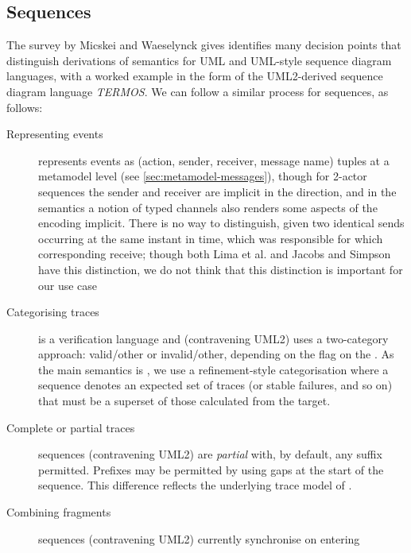

\subsection{Sequences}

The survey by Micskei and Waeselynck gives identifies many decision points that
distinguish derivations of semantics for UML and UML-style sequence diagram
languages, with a worked example in the form of the
UML2-derived sequence diagram language \emph{TERMOS}.
We can follow a similar process for \langname{} sequences, as follows:

\begin{description}
\item[Representing events]
  \langname{} represents events as (action, sender, receiver, message name)
  tuples at a metamodel level (see \cref{sec:metamodel-messages}),
  though for 2-actor sequences the sender and
  receiver are implicit in the direction, and in the \tockcsp{} semantics a
  notion of typed channels also renders some aspects of the encoding implicit.
  There is no way to distinguish, given two identical sends occurring at the
  same instant in time, which was responsible for which corresponding receive;
  though both Lima et al. and Jacobs and Simpson have this distinction,
  we do not think that this distinction is important for our use case
\item[Categorising traces]
  \langname{} is a verification language and (contravening UML2)
  uses a two-category approach: valid/other or invalid/other, depending on the
   flag on the \massertion.
  As the main \langname{} semantics is \tockcsp, we use a
  refinement-style categorisation where a sequence denotes an
  expected set of traces (or stable failures, and so on) that must be a superset
  of those calculated from the target.
\item[Complete or partial traces]
  \langname{} sequences (contravening UML2) are \emph{partial} with, by default,
  any suffix permitted.  Prefixes may be permitted by using gaps at the start of
  the sequence.  This difference reflects the underlying trace model of \tockcsp.
\item[Combining fragments]
  \langname{} sequences (contravening UML2) currently synchronise on entering

\end{description}
